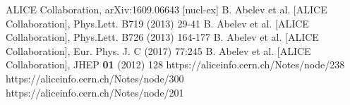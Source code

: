 \begin{thebibliography}{99}
 ALICE Collaboration, arXiv:1609.06643 [nucl-ex]
 B. Abelev et al. [ALICE Collaboration], Phys.Lett. B719 (2013) 29-41
 B. Abelev et al. [ALICE Collaboration], Phys.Lett. B726 (2013) 164-177
 B. Abelev et al. [ALICE Collaboration], Eur. Phys. J. C (2017) 77:245
 B. Abelev et al. [ALICE Collaboration], JHEP {\bf 01} (2012) 128
 https://aliceinfo.cern.ch/Notes/node/238
 https://aliceinfo.cern.ch/Notes/node/300
 https://aliceinfo.cern.ch/Notes/node/201
\end{thebibliography} 